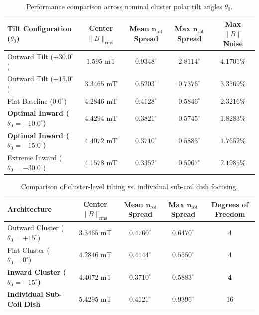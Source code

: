 \documentclass[11pt, a4paper]{article}
\begin{document}
\begin{table}[h!]
\centering
\small
\caption{Performance comparison across nominal cluster polar tilt angles $\theta_0$.}
\label{tab:tilt_results}
\vspace{0.2cm}
\begin{tabular}{lcccc}
\toprule
\textbf{Tilt Configuration ($\theta_0$)} & \textbf{Center $\|B\|_{\text{rms}}$} & \textbf{Mean $\mathbf{n}_{\text{rot}}$ Spread} & \textbf{Max $\mathbf{n}_{\text{rot}}$ Spread} & \textbf{Max $\|B\|$ Noise} \\
\midrule
Outward Tilt ($+30.0^\circ$) & $1.595\text{ mT}$ & $0.9348^\circ$ & $2.8114^\circ$ & $4.1701\%$ \\
Outward Tilt ($+15.0^\circ$) & $3.3465\text{ mT}$ & $0.5203^\circ$ & $0.7376^\circ$ & $3.3569\%$ \\
Flat Baseline ($0.0^\circ$)  & $4.2846\text{ mT}$ & $0.4128^\circ$ & $0.5846^\circ$ & $2.3216\%$ \\
\textbf{Optimal Inward ($\theta_0 = -10.0^\circ$)} & \textbf{$4.4294\text{ mT}$} & $0.3821^\circ$ & $0.5745^\circ$ & $1.8283\%$ \\
\textbf{Optimal Inward ($\theta_0 = -15.0^\circ$)} & $4.4072\text{ mT}$ & \textbf{$0.3710^\circ$} & $0.5883^\circ$ & \textbf{$1.7652\%$} \\
Extreme Inward ($\theta_0 = -30.0^\circ$) & $4.1578\text{ mT}$ & $0.3352^\circ$ & $0.5967^\circ$ & $2.1985\%$ \\
\bottomrule
\end{tabular}
\end{table}

\begin{table}[h!]
\centering
\small
\caption{Comparison of cluster-level tilting vs. individual sub-coil dish focusing.}
\label{tab:architecture_comparison}
\vspace{0.2cm}
\begin{tabular}{lcccc}
\toprule
\textbf{Architecture} & \textbf{Center $\|B\|_{\text{rms}}$} & \textbf{Mean $\mathbf{n}_{\text{rot}}$ Spread} & \textbf{Max $\mathbf{n}_{\text{rot}}$ Spread} & \textbf{Degrees of Freedom} \\
\midrule
Outward Cluster ($\theta_0 = +15^\circ$) & $3.3465\text{ mT}$ & $0.4760^\circ$ & $0.6470^\circ$ & 4 \\
Flat Cluster ($\theta_0 = 0^\circ$)      & $4.2846\text{ mT}$ & $0.4144^\circ$ & $0.5550^\circ$ & 4 \\
\textbf{Inward Cluster ($\theta_0 = -15^\circ$)} & \textbf{$4.4072\text{ mT}$} & \textbf{$0.3710^\circ$} & \textbf{$0.5883^\circ$} & \textbf{4} \\
\textbf{Individual Sub-Coil Dish} & \textbf{$5.4295\text{ mT}$} & $0.4121^\circ$ & $0.9396^\circ$ & 16 \\
\bottomrule
\end{tabular}
\end{table}
\end{document}
